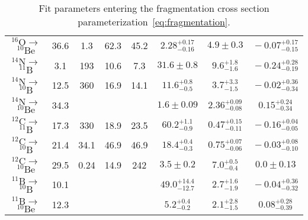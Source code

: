 \documentclass[a4paper,11pt]{article}
\begin{document}
\begin{table}[htp]
\begin{center}
\begin{tabular}{|c|ccccccc|}
 $\!\!^{16}\text{O}\rightarrow$ $^{10}\text{Be}\!$ & 36.6   & 1.3 & 62.3 & 45.2 & $2.28^{+0.17}_{-0.16}$ & $4.9\pm0.3$ & $\!-0.07^{+0.17}_{-0.15}$\!\\[2mm]
 $\!\!^{14}\text{N}\rightarrow$ $^{11}\text{B}\!$  & 3.1    & 193 & 10.6 & 7.3  & $31.6\pm 0.8$& $9.6^{+1.8}_{-1.6}$ & $\!-0.24^{+0.28}_{-0.19}$\!\\[2mm]
 $\!\!^{14}\text{N}\rightarrow$ $^{10}\text{B}\!$  & 12.5   & 360 & 16.9 & 14.1 & $11.6^{+0.8}_{-0.5}$ & $3.7^{+3.3}_{-1.5}$ & $\!-0.02^{+0.36}_{-0.34}$\!\\[2mm]
 $\!\!^{14}\text{N}\rightarrow$ $^{10}\text{Be}\!$  & 34.3  & & & & $1.6\pm 0.09$ & $2.36^{+0.09}_{-0.08}$ & $\!0.15^{+0.24}_{-0.34}$\!\\[2mm]
 $\!\!^{12}\text{C}\rightarrow$ $^{11}\text{B}\!$   & 17.3  & 330& 18.9 & 23.5& $60.2^{+1.1}_{-0.9}$ & $0.47^{+0.15}_{-0.11}$& $\!-0.16^{+0.04}_{-0.05}$\!\\[2mm]
 $\!\!^{12}\text{C}\rightarrow$ $^{10}\text{B}\!$  &  21.4  & 34.1& 46.9 & 46.9 & $18.4^{+0.4}_{-0.3}$& $0.75^{+0.07}_{-0.06}$ & $\!-0.03^{+0.08}_{-0.10}$\!\\[2mm]
 $\!\!^{12}\text{C}\rightarrow$ $^{10}\text{Be}\!$  & 29.5  & 0.24 & 14.9 & 242 & $3.5\pm 0.2$& $7.0^{+0.5}_{-0.4}$ & $\!0.0\pm 0.13$ \!\\[2mm]
 $\!\!^{11}\text{B}\rightarrow$ $^{10}\text{B}\!$  &  10.1  &      &      &     & $49.0^{+14.4}_{-12.7}$ & $2.7^{+1.6}_{-1.9}$ & $\!-0.04^{+0.36}_{-0.32}$\!\\[2mm]
 $\!\!^{11}\text{B}\rightarrow$ $^{10}\text{Be}\!$  & 12.3  & & & & $5.2^{+0.4}_{-0.2}$ & $2.1^{+2.8}_{-1.5}$ & $\!0.08^{+0.28}_{-0.39}$\!\\[2mm]
\hline
\end{tabular}
\end{center}
\caption{Fit parameters entering the fragmentation cross section parameterization~\eqref{eq:fragmentation}.}
\label{tab:fragcross}
\end{table}
\end{document}
